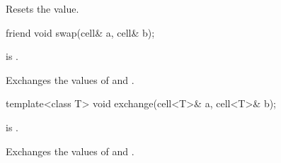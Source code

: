 \begin{itemdescr}
\pnum
\effects
Resets the value.
\end{itemdescr}

%
\begin{itemdecl}
friend void swap(cell& a, cell& b);
\end{itemdecl}

\begin{itemdescr}
\pnum
\constraints
{} is .

\pnum
\effects
Exchanges the values of  and .
\end{itemdescr}

%
\begin{itemdecl}
template<class T>
  void exchange(cell<T>& a, cell<T>& b);
\end{itemdecl}

\begin{itemdescr}
\pnum
\constraints
{} is .

\pnum
\effects
Exchanges the values of  and .
\end{itemdescr}
